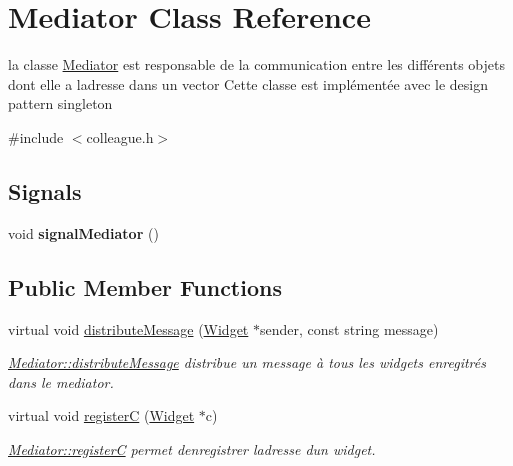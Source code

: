 \hypertarget{classMediator}{}\section{Mediator Class Reference}
\label{classMediator}


la classe \hyperlink{classMediator}{Mediator} est responsable de la communication entre les différents objets dont elle a l\textquotesingle{}adresse dans un vector Cette classe est implémentée avec le design pattern singleton  




{\ttfamily \#include $<$colleague.\+h$>$}

\subsection*{Signals}
\begin{DoxyCompactItemize}
\item 
\mbox{\label{classMediator_a52b7c6839f25654bbc8b4d42d4409f60}} 
void {\bfseries signal\+Mediator} ()
\end{DoxyCompactItemize}
\subsection*{Public Member Functions}
\begin{DoxyCompactItemize}
\item 
virtual void \hyperlink{classMediator_a6d85bc8652e2fbd4f37b7ba67559c9e3}{distribute\+Message} (\hyperlink{classWidget}{Widget} $\ast$sender, const string message)
\begin{DoxyCompactList}\small\item\em \hyperlink{classMediator_a6d85bc8652e2fbd4f37b7ba67559c9e3}{Mediator\+::distribute\+Message} distribue un message à tous les widgets enregitrés dans le mediator. \end{DoxyCompactList}\item 
virtual void \hyperlink{classMediator_aeb991fe5844fcb6ccd40086369373e37}{registerC} (\hyperlink{classWidget}{Widget} $\ast$c)
\begin{DoxyCompactList}\small\item\em \hyperlink{classMediator_aeb991fe5844fcb6ccd40086369373e37}{Mediator\+::registerC} permet d\textquotesingle{}enregistrer l\textquotesingle{}adresse d\textquotesingle{}un widget. \end{DoxyCompactList}\end{DoxyCompactItemize}

